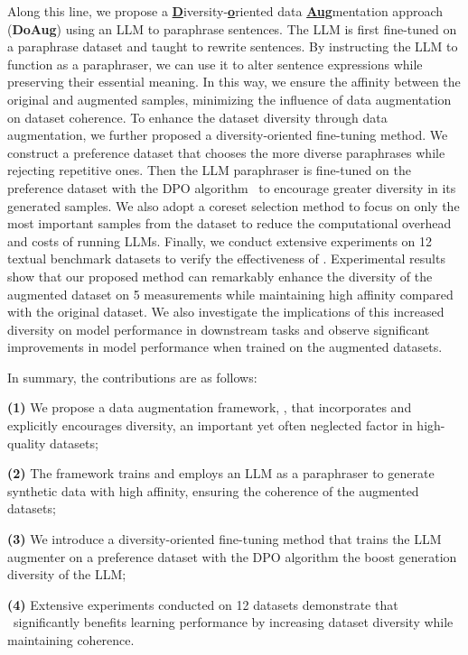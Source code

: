 Along this line, we propose a \textbf{\underline{D}}iversity-\textbf{\underline{o}}riented data \textbf{\underline{Aug}}mentation approach (\textbf{DoAug}) using an LLM to paraphrase sentences. 
The LLM is first fine-tuned on a paraphrase dataset and taught to rewrite sentences. 
By instructing the LLM to function as a paraphraser, we can use it to alter sentence expressions while preserving their essential meaning. 
In this way, we ensure the affinity between the original and augmented samples, minimizing the influence of data augmentation on dataset coherence. 
To enhance the dataset diversity through data augmentation, we further proposed a diversity-oriented fine-tuning method.  
We construct a preference dataset that chooses the more diverse paraphrases while rejecting repetitive ones. 
Then the LLM paraphraser is fine-tuned on the preference dataset with the DPO algorithm~\cite{rafailov2024direct} to encourage greater diversity in its generated samples. 
We also adopt a coreset selection method to focus on only the most important samples from the dataset to reduce the computational overhead and costs of running LLMs. 
Finally, we conduct extensive experiments on 12 textual benchmark datasets to verify the effectiveness of \Methodnamec. 
Experimental results show that our proposed method can remarkably enhance the diversity of the augmented dataset on 5 measurements while maintaining high affinity compared with the original dataset. 
We also investigate the implications of this increased diversity on model performance in downstream tasks and observe significant improvements in model performance when trained on the augmented datasets. 

In summary, the contributions are as follows: 
    
    \textbf{(1)} We propose a data augmentation framework, \Methodname, that incorporates and explicitly encourages diversity, an important yet often neglected factor in high-quality datasets; 
    
    \textbf{(2)} The framework trains and employs an LLM as a paraphraser to generate synthetic data with high affinity, ensuring the coherence of the augmented datasets; 
    
    \textbf{(3)} We introduce a diversity-oriented fine-tuning method that trains the LLM augmenter on a preference dataset with the DPO algorithm the boost generation diversity of the LLM;
    
    \textbf{(4)} Extensive experiments conducted on 12 datasets demonstrate that \Methodnamec~significantly benefits learning performance by increasing dataset diversity while maintaining coherence. 
